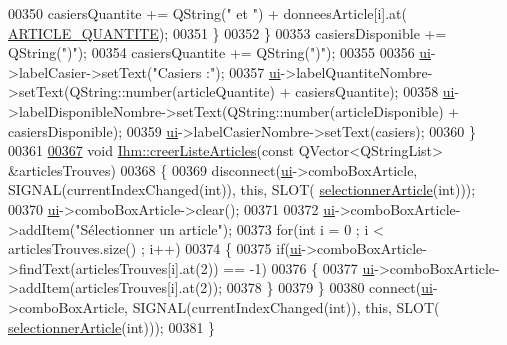\begin{DoxyCode}
00350             casiersQuantite += QString(\textcolor{stringliteral}{" et "}) + donneesArticle[i].at(
      \hyperlink{_ihm_8h_ac91f014239536b9bb49d4265ca91d0d5}{ARTICLE\_QUANTITE});
00351         \}
00352     \}
00353     casiersDisponible += QString(\textcolor{stringliteral}{")"});
00354     casiersQuantite += QString(\textcolor{stringliteral}{")"});
00355 
00356     \hyperlink{class_ihm_a0ac5f47856566ceeeca1720109bf70ea}{ui}->labelCasier->setText(\textcolor{stringliteral}{"Casiers :"});
00357     \hyperlink{class_ihm_a0ac5f47856566ceeeca1720109bf70ea}{ui}->labelQuantiteNombre->setText(QString::number(articleQuantite) + casiersQuantite);
00358     \hyperlink{class_ihm_a0ac5f47856566ceeeca1720109bf70ea}{ui}->labelDisponibleNombre->setText(QString::number(articleDisponible) + casiersDisponible);
00359     \hyperlink{class_ihm_a0ac5f47856566ceeeca1720109bf70ea}{ui}->labelCasierNombre->setText(casiers);
00360 \}
00361 
\hyperlink{class_ihm_ab632796a21015964c8d7615edb09261c}{00367} \textcolor{keywordtype}{void} \hyperlink{class_ihm_ab632796a21015964c8d7615edb09261c}{Ihm::creerListeArticles}(\textcolor{keyword}{const} QVector<QStringList> &articlesTrouves)
00368 \{
00369     disconnect(\hyperlink{class_ihm_a0ac5f47856566ceeeca1720109bf70ea}{ui}->comboBoxArticle, SIGNAL(currentIndexChanged(\textcolor{keywordtype}{int})), \textcolor{keyword}{this}, SLOT(
      \hyperlink{class_ihm_ad9b83836021fc8542db033da186cc64c}{selectionnerArticle}(\textcolor{keywordtype}{int})));
00370     \hyperlink{class_ihm_a0ac5f47856566ceeeca1720109bf70ea}{ui}->comboBoxArticle->clear();
00371 
00372     \hyperlink{class_ihm_a0ac5f47856566ceeeca1720109bf70ea}{ui}->comboBoxArticle->addItem(\textcolor{stringliteral}{"Sélectionner un article"});
00373     \textcolor{keywordflow}{for}(\textcolor{keywordtype}{int} i = 0 ; i < articlesTrouves.size() ; i++)
00374     \{
00375         \textcolor{keywordflow}{if}(\hyperlink{class_ihm_a0ac5f47856566ceeeca1720109bf70ea}{ui}->comboBoxArticle->findText(articlesTrouves[i].at(2)) == -1)
00376         \{
00377             \hyperlink{class_ihm_a0ac5f47856566ceeeca1720109bf70ea}{ui}->comboBoxArticle->addItem(articlesTrouves[i].at(2));
00378         \}
00379     \}
00380     connect(\hyperlink{class_ihm_a0ac5f47856566ceeeca1720109bf70ea}{ui}->comboBoxArticle, SIGNAL(currentIndexChanged(\textcolor{keywordtype}{int})), \textcolor{keyword}{this}, SLOT(
      \hyperlink{class_ihm_ad9b83836021fc8542db033da186cc64c}{selectionnerArticle}(\textcolor{keywordtype}{int})));
00381 \}
\end{DoxyCode}
